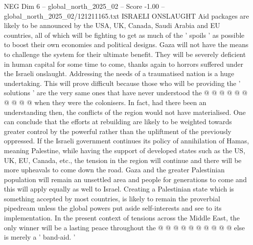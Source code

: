 \begin{textsample}{NEG Dim 6 – global\_north\_2025\_02 – Score -1.00 – global\_north\_2025\_02/121211165.txt}
ISRAELI ONSLAUGHT Aid packages are likely to be announced by the USA, UK, Canada, Saudi Arabia and EU countries, all of which will be fighting to get as much of the ' spoils ' as possible to boost their own economies and political designs.
Gaza will not have the means to challenge the system for their ultimate benefit.
They will be severely deficient in human capital for some time to come, thanks again to horrors suffered under the Israeli onslaught.
Addressing the needs of a traumatised nation is a huge undertaking.
This will prove difficult because those who will be providing the ' solutions ' are the very same ones that have never understood the @ @ @ @ @ @ @ @ @ @ when they were the colonisers.
In fact, had there been an understanding then, the conflicts of the region would not have materialised.
One can conclude that the efforts at rebuilding are likely to be weighted towards greater control by the powerful rather than the upliftment of the previously oppressed.
If the Israeli government continues its policy of annihilation of Hamas, meaning Palestine, while having the support of developed states such as the US, UK, EU, Canada, etc., the tension in the region will continue and there will be more upheavals to come down the road.
Gaza and the greater Palestinian population will remain an unsettled area and people for generations to come and this will apply equally as well to Israel.
Creating a Palestinian state which is something accepted by most countries, is likely to remain the proverbial pipedream unless the global powers put aside self-interests and see to its implementation.
In the present context of tensions across the Middle East, the only winner will be a lasting peace throughout the @ @ @ @ @ @ @ @ @ @ else is merely a ' band-aid. '

\end{textsample}

